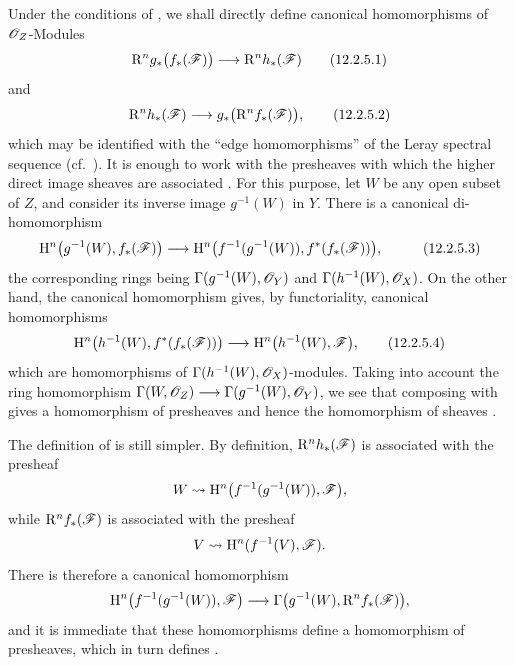 \begin{env}[12.2.5]
\label{0.12.2.5}
Under the conditions of , we shall directly define
canonical homomorphisms of $\mathscr{O}_Z$-Modules
\[
  \mathrm{R}^n g_*\bigl(f_*(\mathscr{F})\bigr)
  \longrightarrow\mathrm{R}^n h_*(\mathscr{F})
  \tag{12.2.5.1}
  \label{0.12.2.5.1}
\]
and
\[
  \mathrm{R}^n h_*(\mathscr{F})
  \longrightarrow g_*\bigl(\mathrm{R}^n f_*(\mathscr{F})\bigr),
  \tag{12.2.5.2}
  \label{0.12.2.5.2}
\]
which may be identified with the ``edge homomorphisms'' of the Leray
spectral sequence (cf.\ ).
It is enough to work with the presheaves with which the higher direct
image sheaves are associated .
For this purpose, let $W$ be any open subset of $Z$, and consider its
inverse image $g^{-1}(W)$ in $Y$.  There is a canonical
di-homomorphism
\[
  \begin{aligned}
  \mathrm{H}^n\bigl(g^{-1}(W),f_*(\mathscr{F})\bigr)
  &\longrightarrow
  \mathrm{H}^n\bigl(f^{-1}(g^{-1}(W)),
    f^*(f_*(\mathscr{F}))\bigr),
  \end{aligned}
  \tag{12.2.5.3}
  \label{0.12.2.5.3}
\]
the corresponding rings being
$\Gamma(g^{-1}(W),\mathscr{O}_Y)$ and
$\Gamma(h^{-1}(W),\mathscr{O}_X)$.
On the other hand, the canonical homomorphism
 gives, by functoriality,
canonical homomorphisms
\[
  \mathrm{H}^n\bigl(h^{-1}(W),f^*(f_*(\mathscr{F}))\bigr)
  \longrightarrow
  \mathrm{H}^n\bigl(h^{-1}(W),\mathscr{F}\bigr),
  \tag{12.2.5.4}
  \label{0.12.2.5.4}
\]
which are homomorphisms of
$\Gamma(h^{-1}(W),\mathscr{O}_X)$-modules.
Taking into account the ring homomorphism $\Gamma(W,\mathscr{O}_Z)
\longrightarrow\Gamma(g^{-1}(W),\mathscr{O}_Y)$,
we see that composing  with
 gives a homomorphism of presheaves and hence the
homomorphism of sheaves .

The definition of  is still simpler.
By definition, $\mathrm{R}^n h_*(\mathscr{F})$ is associated with the presheaf
\[
  W\leadsto
  \mathrm{H}^n\bigl(f^{-1}(g^{-1}(W)),\mathscr{F}\bigr),
\]
while $\mathrm{R}^n f_*(\mathscr{F})$ is associated with the presheaf
\[
  V\leadsto\mathrm{H}^n(f^{-1}(V),\mathscr{F}).
\]
There is therefore a canonical homomorphism
\[
  \mathrm{H}^n\bigl(f^{-1}(g^{-1}(W)),\mathscr{F}\bigr)
  \longrightarrow
  \Gamma\bigl(g^{-1}(W),\mathrm{R}^n f_*(\mathscr{F})\bigr),
\]
and it is immediate that these homomorphisms define a homomorphism of
presheaves, which in turn defines .
\end{env}

